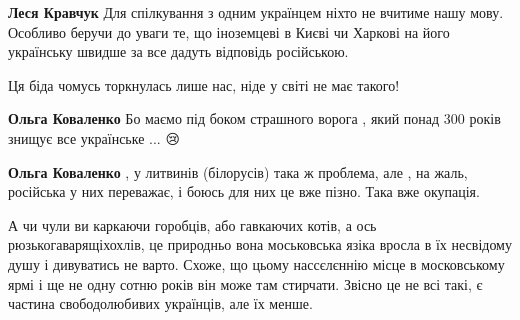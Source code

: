 \begin{itemize}
\begin{itemize}
\begin{itemize}
 
\textbf{Леся Кравчук} Для спілкування з одним українцем ніхто не вчитиме нашу мову. Особливо беручи до уваги те, що іноземцеві в Києві чи Харкові на його українську швидше за все дадуть відповідь російською.
\end{itemize}

\end{itemize}

 

Ця біда чомусь торкнулась лише нас, ніде у світі не має такого!

\begin{itemize}
 
\textbf{Ольга Коваленко} Бо маємо під боком страшного ворога , який понад 300 років знищує все українське ... 😢

 
\textbf{Ольга Коваленко} , у литвинів (білорусів) така ж проблема, але , на жаль, російська у них переважає, і боюсь для них це вже пізно. Така вже окупація.
\end{itemize}

 

А чи чули ви каркаючи горобців, або гавкаючих котів, а ось
рюзькогаварящіхохлів, це природньо вона моськовська язіка вросла в їх несвідому
душу і дивуватись не варто. Схоже, що цьому нассєлєннію місце в московському
ярмі і ще не одну сотню років він може там стирчати. Звісно це не всі такі, є
частина свободолюбивих українців, але їх менше.



\end{itemize}
